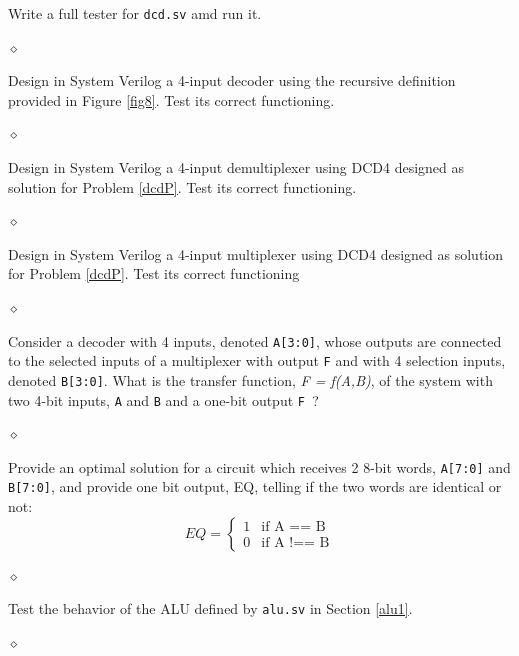 \begin{problem}
Write a full tester for {\tt dcd.sv} amd run it.

$\diamond$
\end{problem}

\begin{problem}\label{dcdP}
Design in System Verilog a 4-input decoder using the recursive definition provided in Figure \ref{fig8}. Test its correct functioning.

$\diamond$
\end{problem}

\begin{problem}
Design in System Verilog a 4-input demultiplexer using DCD4 designed as solution for Problem \ref{dcdP}. Test its correct functioning.

$\diamond$
\end{problem}

\begin{problem}
Design in System Verilog a 4-input multiplexer using DCD4 designed as solution for Problem \ref{dcdP}. Test its correct functioning

$\diamond$
\end{problem}

\begin{problem}\label{eq}
Consider a decoder with 4 inputs, denoted {\tt A[3:0]}, whose outputs are connected to the selected inputs of a multiplexer with output {\tt F} and with 4 selection inputs, denoted {\tt B[3:0]}. What is the transfer function, {\em F = f(A,B)}, of the system with two 4-bit inputs, {\tt A} and {\tt B} and a one-bit output {\tt F }?

$\diamond$
\end{problem}

\begin{problem}
Provide an optimal solution for a circuit which receives 2 8-bit words, {\tt A[7:0]} and {\tt B[7:0]},  and provide one bit output, EQ, telling if the two words are identical or not:
\begin{equation}
  EQ =
    \begin{cases}
      1 & \text{if  A == B}\\
      0 & \text{if  A !== B}
    \end{cases}
\end{equation}

$\diamond$
\end{problem}


\begin{problem}
Test the behavior of the ALU defined by {\tt alu.sv} in Section \ref{alu1}.

$\diamond$
\end{problem}


